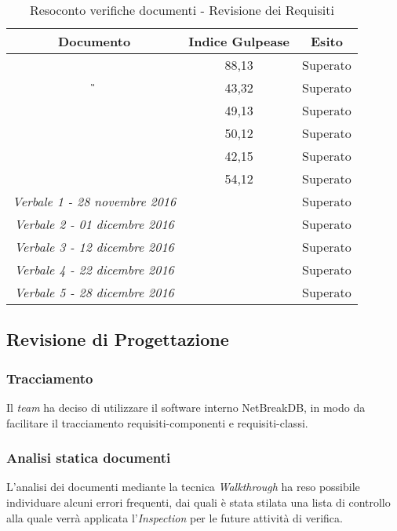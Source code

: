 			\begin{table}[H]
			\begin{center}
				\begin{tabular}{|c|c|c|}
					\hline
					\textbf{Documento}&	{\textbf{Indice Gulpease}} & \textbf{Esito} \\
					\hline
					\textit{\AdR}		&	88,13	&	Superato	\\
					\hline
					\textit{\G}			&	43,32	&	Superato	\\
					\hline
					\textit{\NdP}		&	49,13	&	Superato	\\
					\hline
					\textit{\PdP} 		&	50,12	&	Superato 	\\
					\hline
					\textit{\PdQ} 		&	42,15	&	Superato	\\
					\hline
					\textit{\SdF}		& 	54,12	&	Superato	\\
					\hline
					\textit{Verbale 1 - 28 novembre 2016}		& 		&	Superato	\\
					\hline
					\textit{Verbale 2 - 01 dicembre 2016}		& 		&	Superato	\\
					\hline
					\textit{Verbale 3 - 12 dicembre 2016}		& 		&	Superato	\\
					\hline
					\textit{Verbale 4 - 22 dicembre 2016}		& 		&	Superato	\\
					\hline
					\textit{Verbale 5 - 28 dicembre 2016}		& 		&	Superato	\\
					\hline
				\end{tabular}
			\end{center}
			\caption{Resoconto verifiche documenti - Revisione dei Requisiti}
		\end{table}
	
	\subsection{Revisione di Progettazione}
	
	\subsubsection{Tracciamento}
	Il \textit{team} ha deciso di utilizzare il software interno NetBreakDB, in modo da facilitare il tracciamento requisiti-componenti e requisiti-classi.
	
	\subsubsection{Analisi statica documenti}
	L’analisi dei documenti mediante la tecnica \textit{Walkthrough} ha reso possibile individuare alcuni errori frequenti, dai quali è stata stilata una lista di controllo alla quale verrà applicata l’\textit{Inspection} per le future attività di verifica.
	
